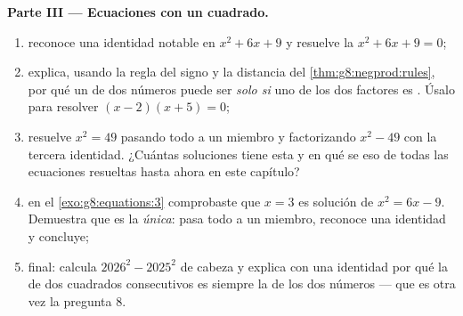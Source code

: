 \begin{problem}[{Problema de fin de semana --- $(a+b)^2$, $(a-b)^2$,
$(a+b)(a-b)$ y la suma $1 + 3 + 5 + \dots + (2n-1) = n^2$}]
\medskip
\noindent\textbf{Parte III --- Ecuaciones con un cuadrado.}
\begin{enumerate}[resume]
  \item reconoce una identidad notable en $x^2 + 6x + 9$ y
        resuelve la  $x^2 + 6x + 9 = 0$;
  \item explica, usando la regla del signo y la distancia del
        \cref{thm:g8:negprod:rules}, por qué un  de dos números
        puede ser  \emph{solo si} uno de los dos factores es .
        Úsalo para resolver $(x - 2)(x + 5) = 0$;
  \item resuelve $x^2 = 49$ pasando todo a un miembro y
        factorizando $x^2 - 49$ con la tercera identidad. ¿Cuántas
        soluciones tiene esta  y en qué se  eso
        de todas las ecuaciones resueltas hasta ahora en este capítulo?
  \item en el \cref{exo:g8:equations:3} comprobaste que $x = 3$ es
        solución de $x^2 = 6x - 9$. Demuestra que es la
        \emph{única}: pasa todo a un miembro, reconoce
        una identidad y concluye;
  \item final: calcula $2026^2 - 2025^2$ de cabeza y
        explica con una identidad por qué la  de dos
        cuadrados consecutivos es siempre la  de los dos números
        --- que es otra vez la pregunta 8.
\end{enumerate}
\end{problem}
